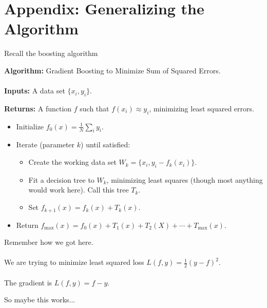 \section{Appendix: Generalizing the Algorithm}

\begin{frame}
Recall the boosting algorithm

\textbf{Algorithm:} Gradient Boosting to Minimize Sum of Squared Errors.\\~\\

\textbf{Inputs:} A data set $\{ x_i, y_i \}$.

\textbf{Returns:} A function $f$ such that $f(x_i) \approx y_i$, minimizing least squared errors.

\begin{itemize}
  \item Initialize $f_0(x) = \frac{1}{N} \sum_i y_i$.
  \item Iterate (parameter $k$) until satisfied: \begin{itemize}
    \item Create the working data set $W_k = \{ x_i, y_i - f_k(x_i) \}$.
    \item Fit a decision tree to $W_k$, minimizing least squares (though most anything would work here).  Call this tree $T_k$.
    \item Set $f_{k+1}(x) = f_{k}(x) + T_{k}(x)$. 
  \end{itemize}
  \item Return $f_{\text{max}}(x) = f_0(x) + T_1(x) + T_2(X) + \cdots + T_{\text{max}}(x)$.
\end{itemize}
\end{frame}
%
\begin{frame}

Remember how we got here. \\~\\

We are trying to minimize least squared loss $L(f, y) = \frac{1}{2}(y - f)^2$.\\~\\

The gradient is $L(f, y) = f - y$.
\end{frame}
%
\begin{frame}
So maybe this works...
\end{frame}
%
